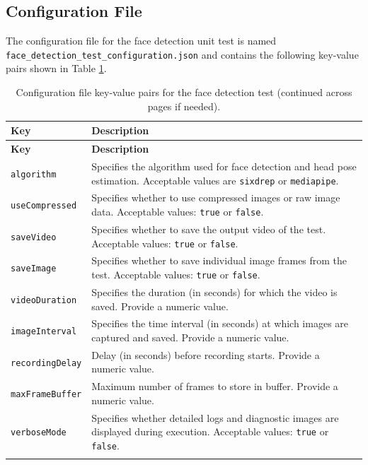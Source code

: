 \documentclass{CSSRforAfrica}
\begin{document}
{\subsection*{Configuration File}
The configuration file for the face detection unit test is named \\
\texttt{face\_detection\_test\_configuration.json} and contains the following key-value pairs shown in Table \ref{tab:face_detection_config}.

\begin{longtable}{|p{3.5cm}|p{11.0cm}|}
	\hline
	\rowcolor{blue!20}
	\textbf{Key} & \textbf{Description} \\
	\hline
	\endfirsthead
	
	\hline
	\rowcolor{blue!20}
	\textbf{Key} & \textbf{Description} \\
	\hline
	\endhead
	
	\texttt{algorithm} & Specifies the algorithm used for face detection and head pose estimation. Acceptable values are \texttt{sixdrep} or \texttt{mediapipe}. \\
	\hline
	\texttt{useCompressed} & Specifies whether to use compressed images or raw image data. Acceptable values: \texttt{true} or \texttt{false}. \\
	\hline
	\texttt{saveVideo} & Specifies whether to save the output video of the test. Acceptable values: \texttt{true} or \texttt{false}. \\
	\hline
	\texttt{saveImage} & Specifies whether to save individual image frames from the test. Acceptable values: \texttt{true} or \texttt{false}. \\
	\hline
	\texttt{videoDuration} & Specifies the duration (in seconds) for which the video is saved. Provide a numeric value. \\
	\hline
	\texttt{imageInterval} & Specifies the time interval (in seconds) at which images are captured and saved. Provide a numeric value. \\
	\hline
	\texttt{recordingDelay} & Delay (in seconds) before recording starts. Provide a numeric value. \\
	\hline
	\texttt{maxFrameBuffer} & Maximum number of frames to store in buffer. Provide a numeric value. \\
	\hline
	\texttt{verboseMode} & Specifies whether detailed logs and diagnostic images are displayed during execution. Acceptable values: \texttt{true} or \texttt{false}. \\
	\hline
	
	\caption{Configuration file key-value pairs for the face detection test (continued across pages if needed).}
	\label{tab:face_detection_config}
\end{longtable}


}
\end{document}

